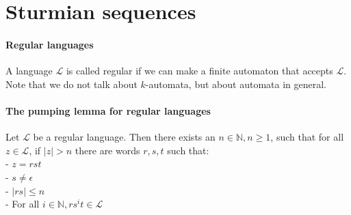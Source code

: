 \documentclass{article}
\begin{document}
\section*{Sturmian sequences}
\paragraph{Regular languages}
A language $\mathcal{L}$ is called regular if we can make a finite automaton
that accepts $\mathcal{L}$. Note that we do not talk about $k$-automata, but
about automata in general.

\paragraph{The pumping lemma for regular languages}
\begin{automata}
Let $\mathcal{L}$ be a regular language. Then there 
exists an $n \in \mathbb{N}, n \ge 1$, such that for all $z \in \mathcal{L}$, 
if $|z| > n$ there are words $r, s, t$ such that:\\
- $z = rst$\\
- $s \ne \epsilon$\\
- $|rs| \le n$\\
- For all $i \in \mathbb{N}, r s^i t \in \mathcal{L}$
\end{automata}
\end{document}
